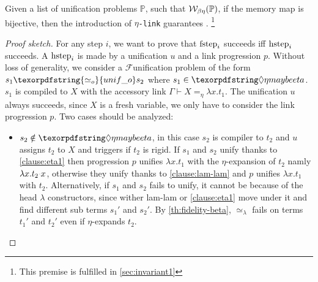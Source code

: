 \documentclass[sigconf,natbib=false,review]{acmart}
\newcommand{\appsep}{\ensuremath{\textcolor{lightgray}{\cdot}}}
\newcommand{\UnifRel}{\ensuremath{\simeq}}
\newcommand{\Uo}{\texorpdfstring{\ensuremath{\UnifRel_o}\xspace}{unif\_o}}
\newcommand{\Ue}{\ensuremath{\UnifRel_\lambda}\xspace}
\newcommand{\linkMacro}[1]{\ensuremath{#1}\texttt{-link}\xspace}
\newcommand{\linketa} {\linkMacro{\eta}}
\newcommand{\Fo}{\texorpdfstring{\ensuremath{\mathcal{F}\xspace}}{F}} %
\newcommand{\linketaM}[3]{\ensuremath{#1 \vdash #2 =_\eta #3}}
\newcommand{\linkStore}{\texorpdfstring{\ensuremath{\mathbb{L}}\xspace}{L}}
\newcommand{\foUnifPb}{\ensuremath{\mathbb{P}}\xspace}
\newcommand{\hoUnifPb}{\ensuremath{\mathbb{T}}\xspace}
\begin{document}
\begin{theorem}
  Given a list of unification problems \foUnifPb, such that
  $\wellb_{\beta \eta}(\foUnifPb)$, if the 
  memory map is bijective, then
  the introduction 
  of \linketa guarantees .
  \footnote{This premise is fulfilled in \cref{sec:invariant1}}
  \label{lemma:fidelity-maybeeta}
\end{theorem}

\begin{proof}[Proof sketch]
  For any step $i$, we want to prove that $\mathrm{fstep}_i$ succeeds iff $\mathrm{hstep}_i$
  succeeds. A $\mathrm{hstep}_i$ is made by a unification $u$ and a link
  progression $p$.
  Without loss of generality, we consider a
  \Fo unification problem of the form $s_1 \Uo s_2$
  where $s_1 \in \maybeeta$. $s_1$ is compiled to $X$ with the accessory link
  $\linketaM{\Gamma}{X}{\lambda x.t_1}$. 
  The unification $u$ always succeeds, since $X$ is a fresh variable, we 
  only have to consider the link progression $p$.
  Two cases should be analyzed:
  \begin{itemize}
    \item $s_2 \notin \maybeeta$,
          in this case $s_2$ is compiler to $t_2$ and $u$ assigns $t_2$ to $X$
          and triggers \progressetaleft if $t_2$ is rigid.
          If $s_1$ and $s_2$ unify thanks to \ref{clause:eta1} then
          progression $p$ unifies $\lambda x.t_1$ with the $\eta$-expansion of $t_2$ namly
          $\lambda x.t_2\appsep x$, otherwise they unify thanks to \cref{clause:lam-lam}
          and $p$ unifies $\lambda x.t_1$ with $t_2$. Alternatively, if $s_1$ and $s_2$ fails
          to unify, it cannot be because of the head $\lambda$ constructors,
          since wither lam-lam or \ref{clause:eta1} move under it and find
          different sub terms $s_1'$ and $s_2'$. By \cref{th:fidelity-beta},
          \Ue fails on terms $t_1'$ and $t_2'$ even if \progressetaleft
          $\eta$-expands $t_2$.



\end{itemize}
\end{proof}
\end{document}
